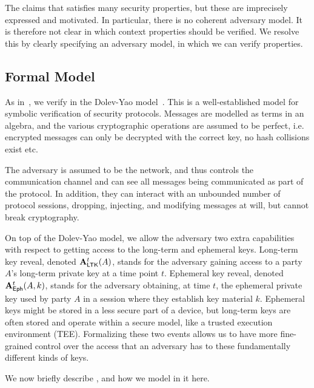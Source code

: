The \mEdhoc{} \mSpec{} \cite{our-analysis-selander-lake-edhoc-00} claims
that \mEdhoc{} satisfies many security properties, but these are imprecisely
expressed and motivated.
%
In particular, there is no coherent adversary model.
%
It is therefore not clear in which context properties should be verified.
%
We resolve this by clearly specifying an adversary model, in which we can verify
properties.
%

\subsection{Formal Model}\label{sec:threat-model}

As in~\cite{Norr21}, we verify \mEdhoc{} in the Dolev-Yao model~\cite{DY83}.
%
This is a well-established model for symbolic verification of security protocols.
%
Messages are modelled as terms in an algebra, and the various cryptographic operations are assumed to be perfect, i.e. encrypted messages can only be decrypted with the correct key, no hash collisions exist etc.
%

The adversary is assumed to be the network, and thus controls the communication channel and can see all messages being communicated as part of the protocol.
%
In addition, they can interact with an unbounded number of protocol sessions, dropping, injecting, and modifying messages at will, but cannot break cryptography.

On top of the Dolev-Yao model, we allow the adversary two extra capabilities with respect to getting access to the long-term and ephemeral keys. 
%
Long-term key reveal, denoted $\mathbf{A}_{\textsf{LTK}}^{t}(A)$, stands for the adversary
gaining access to a party $A$'s long-term private key  at a time point $t$.
%
Ephemeral key reveal, denoted $\mathbf{A}_{\textsf{Eph}}^{t}(A, k)$, stands for the adversary obtaining, at time $t$, the ephemeral private key  used by party $A$  in a session where they establish key material $k$.
%
Ephemeral keys might be stored in a less secure part of a device, but long-term keys are often stored and operate within a secure model, like a trusted execution environment (TEE). 
%
Formalizing these two events allows us to have more fine-grained control over the access that an adversary has to these fundamentally different kinds of keys.
%

We now briefly describe \mTamarin{}, and how we model \mEdhoc{} in it here.

